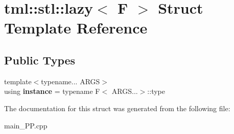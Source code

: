 \hypertarget{structtml_1_1stl_1_1lazy}{\section{tml\+:\+:stl\+:\+:lazy$<$ F $>$ Struct Template Reference}
\label{structtml_1_1stl_1_1lazy}
}
\subsection*{Public Types}
\begin{DoxyCompactItemize}
\item 
\hypertarget{structtml_1_1stl_1_1lazy_a50523c5e3785820362fe07dc6361ca91}{{\footnotesize template$<$typename... A\+R\+G\+S$>$ }\\using {\bfseries instance} = typename F$<$ A\+R\+G\+S...$>$\+::type}\label{structtml_1_1stl_1_1lazy_a50523c5e3785820362fe07dc6361ca91}

\end{DoxyCompactItemize}


The documentation for this struct was generated from the following file\+:\begin{DoxyCompactItemize}
\item 
main\+\_\+\+P\+P.\+cpp\end{DoxyCompactItemize}
